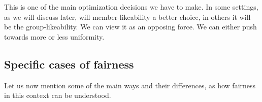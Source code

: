This is one of the main optimization decisions we have to make. In some settings, as we will discuss later, will member-likeability a better choice, in others it will be the group-likeability. We can view it as an opposing force. We can either push towards more or less uniformity.


\subsection{Specific cases of fairness} \label{subsec:specific_cases_of_fairness}
Let us now mention some of the main ways and their differences, as how fairness in this context can be understood.

